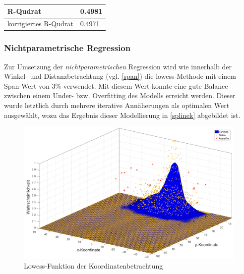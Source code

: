 \tablehead{}
\tabletail{}
\tablelasttail{}
\begin{center}%
\begin{supertabular}{ | P{6cm} | P{3cm}  |}
\textsf{R-Qudrat} 	& 0.4981	\\
\hline
\textsf{korrigiertes R-Qudrat} 	&  0.4971	\\
\hline
\end{supertabular}
\end{center}

\subsubsection{Nichtparametrische Regression}

Zur Umsetzung der \textit{nichtparametrischen} Regression wird wie innerhalb der Winkel- und Distanzbetrachtung (vgl. \vref{span}) die \gls{lowess}-Methode mit einem Span-Wert von \textsf{3\%} verwendet. Mit diesem Wert konnte eine gute Balance zwischen einem Under- bzw. Overfitting des Modells erreicht werden. Dieser wurde letztlich durch mehrere iterative Annäherungen als optimalen Wert ausgewählt, wozu\enlargethispage{2\baselineskip} das Ergebnis dieser Modellierung in \vref{splinek} abgebildet ist.

\begin{figure}[H]
\centering
\includegraphics[scale=0.34]{se-wa-jpg/splinek}
\caption{Lowess-Funktion der Koordinatenbetrachtung}
\label{splinek}
\end{figure}

